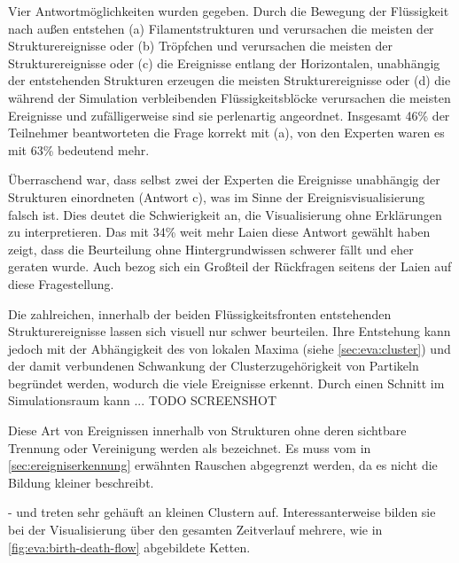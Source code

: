 Vier Antwortmöglichkeiten wurden gegeben. Durch die Bewegung der Flüssigkeit nach außen entstehen (a) Filamentstrukturen und verursachen die meisten der Strukturereignisse oder (b) Tröpfchen und verursachen die meisten der Strukturereignisse oder (c) die Ereignisse entlang der Horizontalen, unabhängig der entstehenden Strukturen erzeugen die meisten Strukturereignisse oder (d) die während der Simulation verbleibenden Flüssigkeitsblöcke verursachen die meisten Ereignisse und zufälligerweise sind sie perlenartig angeordnet. Insgesamt 46\% der Teilnehmer beantworteten die Frage korrekt mit (a), von den Experten waren es mit 63\% bedeutend mehr.

Überraschend war, dass selbst zwei der Experten die Ereignisse unabhängig der Strukturen einordneten (Antwort c), was im Sinne der Ereignisvisualisierung falsch ist. Dies deutet die Schwierigkeit an, die Visualisierung ohne Erklärungen zu interpretieren. Das mit 34\% weit mehr Laien diese Antwort gewählt haben zeigt, dass die Beurteilung ohne Hintergrundwissen schwerer fällt und eher geraten wurde. Auch bezog sich ein Großteil der Rückfragen seitens der Laien auf diese Fragestellung.

Die zahlreichen, innerhalb der beiden Flüssigkeitsfronten entstehenden Strukturereignisse lassen sich visuell nur schwer beurteilen. Ihre Entstehung kann jedoch mit der Abhängigkeit des \CFD von lokalen Maxima (siehe \autoref{sec:eva:cluster}) und der damit verbundenen Schwankung der Clusterzugehörigkeit von Partikeln begründet werden, wodurch die  viele Ereignisse erkennt. Durch einen Schnitt im Simulationsraum kann ... TODO SCREENSHOT

Diese Art von Ereignissen innerhalb von Strukturen ohne deren sichtbare Trennung oder Vereinigung werden als  bezeichnet. Es muss vom in \autoref{sec:ereigniserkennung} erwähnten Rauschen abgegrenzt werden, da es nicht die Bildung kleiner  beschreibt.

- und  treten sehr gehäuft an kleinen Clustern auf. Interessanterweise bilden sie bei der Visualisierung über den gesamten Zeitverlauf mehrere, wie in \autoref{fig:eva:birth-death-flow} abgebildete Ketten.

